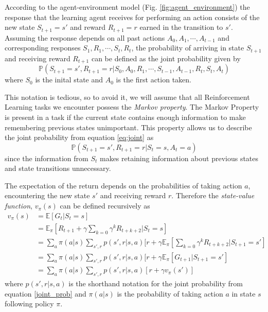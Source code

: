\documentclass[11pt]{article}
\begin{document}
According to the agent-environment model (Fig. \ref{fig:agent_environment}) the response that
the learning agent receives for performing an action consists
of the new state $S_{t+1} = s'$ and reward $R_{t+1} = r$ earned in the transition
to $s'$.
Assuming the response depends on all past actions $A_{0}, A_{1}, \cdots, A_{t-1}$ and
corresponding responses $S_{1}, R_{1}, \cdots, S_{t}, R_{t}$, the probability
of arriving in state $S_{t+1}$ and receiving reward $R_{t+1}$ can be defined as the
joint probability given by
\begin{equation}\label{eq:joint}
    \mathds{P}(S_{t+1} = s', R_{t+1} = r | S_0, A_0, R_1, \cdots, S_{t-1}, A_{t-1}, R_{t}, S_{t}, A_{t})
\end{equation}
where $S_0$ is the inital state and $A_0$ is the first action taken.

This notation is tedious, so to avoid it, we will assume that all Reinforcement Learning tasks
we encounter possess the \textit{Markov property}.
The Markov Property is present in a task if the current state contains
enough information to make remembering previous states unimportant.
This property allows us to describe the joint probability from equation \ref{eq:joint}
as
\begin{equation}\label{joint_prob}
    \mathds{P}(S_{t+1} = s', R_{t+1} = r | S_t = s, A_t = a)
\end{equation}
since the information from $S_t$ makes retaining information about previous states
and state transitions unnecessary.

The expectation of the return depends on the probabilities of taking action $a$,
encountering the new state $s'$ and receiving reward $r$.
Therefore the \textit{state-value function}, $v_\pi(s)$ can be defined recursively as
\begin{equation}
    \begin{aligned}
        v_\pi(s) &= \mathds{E}[ G_t | S_t = s]\\
        & = \mathds{E}_\pi[R_{t+1} + \gamma \sum\limits_{k=0} \gamma^k R_{t+k+2} | S_t = s]\\
        & = \sum\limits_{a} \pi(a|s) \sum\limits_{s', r} p(s', r | s, a) [r + \gamma \mathds{E}_\pi[\sum\limits_{k=0} \gamma^k R_{t+k+2} | S_{t+1} = s']\\
        & =  \sum\limits_{a} \pi(a|s) \sum\limits_{s', r} p(s', r | s, a) [r + \gamma \mathds{E}_\pi[G_{t+1} | S_{t+1} = s']\\
        & =   \sum\limits_{a} \pi(a|s) \sum\limits_{s', r} p(s', r | s, a) [r + \gamma v_\pi(s')]
    \end{aligned}
\end{equation}
where $p(s', r | s, a)$ is the shorthand notation for the joint probability from equation \ref{joint_prob} and $\pi(a|s)$ is the
probability of taking action $a$ in state $s$ following policy $\pi$.

%
%
\end{document}
